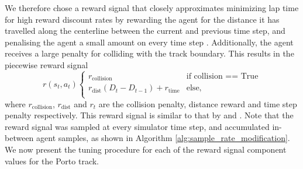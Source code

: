We therefore chose a reward signal that closely approximates minimizing lap time for high reward discount rates by rewarding the agent for the distance it has travelled along the centerline between the current and previous time step, and penalising the agent a small amount on every time step \cite{Fuchs2021}. 
Additionally, the agent receives a large penalty for colliding with the track boundary. 
This results in the piecewise reward signal
\begin{dmath}
r(s_t,a_t)
\begin{cases}
r_{\text{collision}} & \mbox{if collision == True} \\
r_{\text{dist}}(D_{t} - D_{t-1}) + r_{\text{time}} & \mbox{else,} \\
\end{cases}
\label{eq:reward_signal}
\end{dmath}
where $r_{\text{collision}}$, $r_{\text{dist}}$ and $r_{t}$ are the collision penalty, distance reward and time step penalty respectively. 
This reward signal is similar to that by \cite{Song2021, Fuchs2021, Ivanov2020, Perot2017, Jaritz2018, brunnbauer2021} and \cite{Evans2021b}.
Note that the reward signal was sampled at every simulator time step, and accumulated in-between agent samples, as shown in Algorithm \ref{alg:sample_rate_modification}. 
We now present the tuning procedure for each of the reward signal component values for the Porto track.

